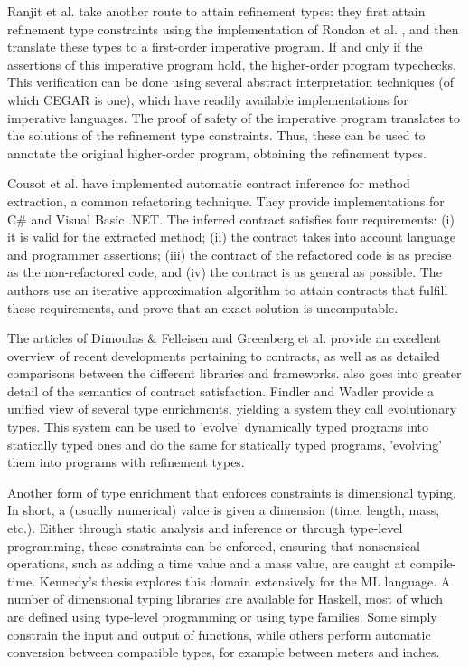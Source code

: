 \documentclass[10pt]{report}
\begin{document}
Ranjit et al. \cite{jhala2010refinement} take another route to attain refinement types: they first attain refinement type constraints using the implementation of Rondon et al. \cite{rondon2008liquid}, and then translate these types to a first-order imperative program.
If and only if the assertions of this imperative program hold, the higher-order program typechecks.
This verification can be done using several abstract interpretation techniques (of which CEGAR is one), which have readily available implementations for imperative languages.
The proof of safety of the imperative program translates to the solutions of the refinement type constraints.
Thus, these can be used to annotate the original higher-order program, obtaining the refinement types.

Cousot et al. \cite{cousotabstract} have implemented automatic contract inference for method extraction, a common refactoring technique.
They provide implementations for C\# and Visual Basic .NET.
The inferred contract satisfies four requirements: (i) it is valid for the extracted method; (ii) the contract takes into account language and programmer assertions; (iii) the contract of the refactored code is as precise as the non-refactored code, and (iv) the contract is as general as possible.
The authors use an iterative approximation algorithm to attain contracts that fulfill these requirements, and prove that an exact solution is uncomputable.

The articles of Dimoulas \& Felleisen \cite{Dimoulas:2011:CSH:2039346.2039348} and Greenberg et al. \cite{Greenberg:2010:CMM:1707801.1706341} provide an excellent overview of recent developments pertaining to contracts, as well as as detailed comparisons between the different libraries and frameworks. \cite{Dimoulas:2011:CSH:2039346.2039348} also goes into greater detail of the semantics of contract satisfaction.
Findler and Wadler \cite{Wadler:2009:WPC:1532974.1532976} provide a unified view of several type enrichments, yielding a system they call evolutionary types.
This system can be used to 'evolve' dynamically typed programs into statically typed ones and do the same for statically typed programs, 'evolving' them into programs with refinement types.

Another form of type enrichment that enforces constraints is dimensional typing.
In short, a (usually numerical) value is given a dimension (time, length, mass, etc.).
Either through static analysis and inference or through type-level programming, these constraints can be enforced, ensuring that nonsensical operations, such as adding a time value and a mass value, are caught at compile-time.
Kennedy's thesis \cite{langanddim} explores this domain extensively for the ML language. 
A number of dimensional typing libraries are available for Haskell, most of which are defined using type-level programming or using type families.
Some simply constrain the input and output of functions, while others perform automatic conversion between compatible types, for example between meters and inches.
\end{document}
